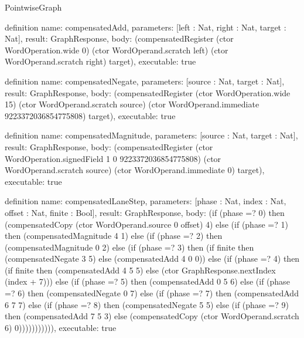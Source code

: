 \begin{lexlean}{PointwiseGraph}
\begin{semanticmodule}
definition{
  name: compensatedAdd,
  parameters: [left : Nat, right : Nat, target : Nat],
  result: GraphResponse,
  body: (compensatedRegister (ctor WordOperation.wide 0) (ctor WordOperand.scratch left) (ctor WordOperand.scratch right) target),
  executable: true
}

definition{
  name: compensatedNegate,
  parameters: [source : Nat, target : Nat],
  result: GraphResponse,
  body: (compensatedRegister (ctor WordOperation.wide 15) (ctor WordOperand.scratch source) (ctor WordOperand.immediate 9223372036854775808) target),
  executable: true
}

definition{
  name: compensatedMagnitude,
  parameters: [source : Nat, target : Nat],
  result: GraphResponse,
  body: (compensatedRegister (ctor WordOperation.signedField 1 0 9223372036854775808) (ctor WordOperand.scratch source) (ctor WordOperand.immediate 0) target),
  executable: true
}

definition{
  name: compensatedLaneStep,
  parameters: [phase : Nat, index : Nat, offset : Nat, finite : Bool],
  result: GraphResponse,
  body: (if (phase =? 0) then (compensatedCopy (ctor WordOperand.source 0 offset) 4)
     else (if (phase =? 1) then (compensatedMagnitude 4 1)
     else (if (phase =? 2) then (compensatedMagnitude 0 2)
     else (if (phase =? 3) then (if finite then (compensatedNegate 3 5) else (compensatedAdd 4 0 0))
     else (if (phase =? 4) then (if finite then (compensatedAdd 4 5 5) else (ctor GraphResponse.nextIndex (index + 7)))
     else (if (phase =? 5) then (compensatedAdd 0 5 6)
     else (if (phase =? 6) then (compensatedNegate 0 7)
     else (if (phase =? 7) then (compensatedAdd 6 7 7)
     else (if (phase =? 8) then (compensatedNegate 5 5)
     else (if (phase =? 9) then (compensatedAdd 7 5 3)
     else (compensatedCopy (ctor WordOperand.scratch 6) 0))))))))))),
  executable: true
}


\end{semanticmodule}
\end{lexlean}
